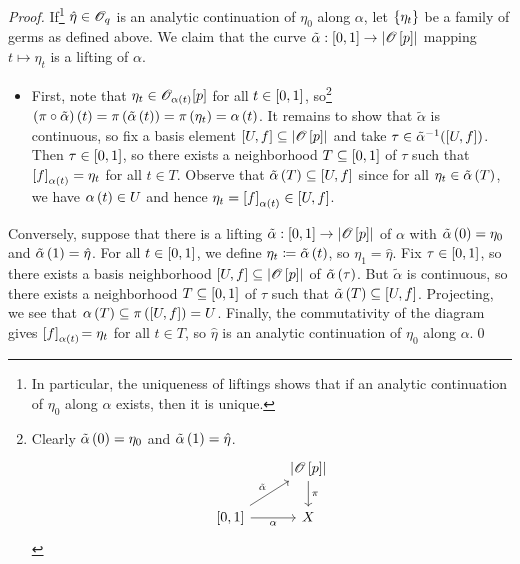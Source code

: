 \documentclass[../Moduli_Spaces_of_Riemann_Surfaces.tex]{subfiles}
\begin{document}
    \begin{proof}
        If\footnote{In particular, the uniqueness of liftings shows that if an analytic continuation of $\eta_0$ along $\alpha$ exists, then it is unique.} $\hat{\eta}\in\mathscr{O}_q$ is an analytic continuation of $\eta_0$ along $\alpha$, let $\left\{\eta_t\right\}$ be a family of germs as defined above. We claim that the curve $\tilde{\alpha}:\left[0,1\right]\to\left|\mathscr{O}\left[p\right]\right|$ mapping $t\mapsto\eta_t$ is a lifting of $\alpha$.
        \begin{itemize}
            \item First, note that $\eta_t\in\mathscr{O}_{\alpha\left(t\right)}\!\left[p\right]$ for all $t\in\left[0,1\right]$, so\footnote{Clearly $\tilde{\alpha}\left(0\right)=\eta_0$ and $\tilde{\alpha}\left(1\right)=\hat{\eta}$.
                \begin{equation*}
                    \begin{tikzcd}[ampersand replacement=\&]
                        \& \l|\HOLO\l[p\r]\r| \ar[d, "\pi"] \\
                        \l[0,1\r] \ar[r, "\alpha"'] \ar[ur, "\tilde{\alpha}"] \& X
                    \end{tikzcd}
                \end{equation*}
                } $\left(\pi\circ\tilde{\alpha}\right)\left(t\right)=\pi\left(\tilde{\alpha}\left(t\right)\right)=\pi\left(\eta_t\right)=\alpha\left(t\right)$. It remains to show that $\tilde{\alpha}$ is continuous, so fix a basis element $\left[U,f\right]\subseteq\left|\mathscr{O}\left[p\right]\right|$ and take $\tau\in\tilde{\alpha}^{-1}\!\left(\left[U,f\right]\right)$. Then $\tau\in\left[0,1\right]$, so there exists a neighborhood $T\subseteq\left[0,1\right]$ of $\tau$ such that $\left[f\right]_{\alpha\left(t\right)}=\eta_t$ for all $t\in T$. Observe that $\tilde{\alpha}\left(T\right)\subseteq\left[U,f\right]$ since for all $\eta_t\in\tilde{\alpha}\left(T\right)$, we have $\alpha\left(t\right)\in U$ and hence $\eta_t=\left[f\right]_{\alpha\left(t\right)}\in\left[U,f\right]$.
        \end{itemize}
        Conversely, suppose that there is a lifting $\tilde{\alpha}:\left[0,1\right]\to\left|\mathscr{O}\left[p\right]\right|$ of $\alpha$ with $\tilde{\alpha}\left(0\right)=\eta_0$ and $\tilde{\alpha}\left(1\right)=\hat{\eta}$. For all $t\in\left[0,1\right]$, we define $\eta_t\coloneqq\tilde{\alpha}\left(t\right)$, so $\eta_1=\hat{\eta}$. Fix $\tau\in\left[0,1\right]$, so there exists a basis neighborhood $\left[U,f\right]\subseteq\left|\mathscr{O}\left[p\right]\right|$ of $\tilde{\alpha}\left(\tau\right)$. But $\tilde{\alpha}$ is continuous, so there exists a neighborhood $T\subseteq\left[0,1\right]$ of $\tau$ such that $\tilde{\alpha}\left(T\right)\subseteq\left[U,f\right]$. Projecting, we see that $\alpha\left(T\right)\subseteq\pi\left(\left[U,f\right]\right)=U$. Finally, the commutativity of the diagram gives $\left[f\right]_{\alpha\left(t\right)}\!=\eta_t$ for all $t\in T$, so $\hat{\eta}$ is an analytic continuation of $\eta_0$ along $\alpha$.\qed
    \end{proof}
\end{document}
